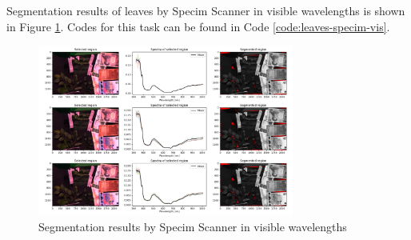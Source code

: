 Segmentation results of leaves by Specim Scanner in visible
wavelengths is shown in Figure \ref{fig:leaves-specim-vis}.
Codes for this task can be found in Code \ref{code:leaves-specim-vis}.
\begin{figure}[H]
  \centering
  \caption{Segmentation results by Specim Scanner in visible wavelengths}
  \label{fig:leaves-specim-vis}
  \includegraphics[width=0.75\textwidth]{./fig/task2/specim-scanner-vis.png}
\end{figure}

